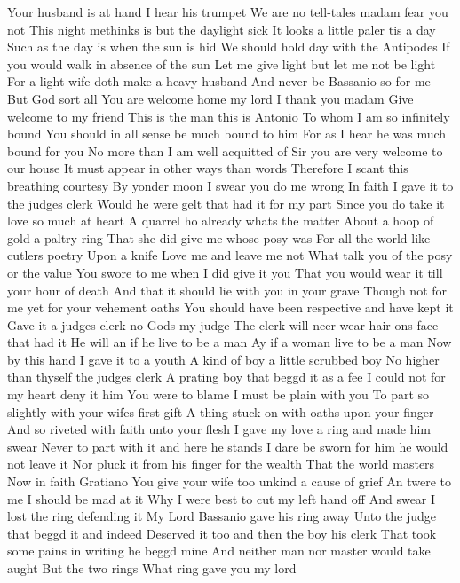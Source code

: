 Your husband is at hand I hear his trumpet 
We are no tell-tales madam fear you not 
This night methinks is but the daylight sick 
It looks a little paler tis a day 
Such as the day is when the sun is hid 
We should hold day with the Antipodes 
If you would walk in absence of the sun 
Let me give light but let me not be light 
For a light wife doth make a heavy husband 
And never be Bassanio so for me 
But God sort all You are welcome home my lord 
I thank you madam Give welcome to my friend 
This is the man this is Antonio 
To whom I am so infinitely bound 
You should in all sense be much bound to him 
For as I hear he was much bound for you 
No more than I am well acquitted of 
Sir you are very welcome to our house 
It must appear in other ways than words 
Therefore I scant this breathing courtesy 
By yonder moon I swear you do me wrong 
In faith I gave it to the judges clerk 
Would he were gelt that had it for my part 
Since you do take it love so much at heart 
A quarrel ho already whats the matter 
About a hoop of gold a paltry ring 
That she did give me whose posy was 
For all the world like cutlers poetry 
Upon a knife Love me and leave me not 
What talk you of the posy or the value 
You swore to me when I did give it you 
That you would wear it till your hour of death 
And that it should lie with you in your grave 
Though not for me yet for your vehement oaths 
You should have been respective and have kept it 
Gave it a judges clerk no Gods my judge 
The clerk will neer wear hair ons face that had it 
He will an if he live to be a man 
Ay if a woman live to be a man 
Now by this hand I gave it to a youth 
A kind of boy a little scrubbed boy 
No higher than thyself the judges clerk 
A prating boy that beggd it as a fee 
I could not for my heart deny it him 
You were to blame I must be plain with you 
To part so slightly with your wifes first gift 
A thing stuck on with oaths upon your finger 
And so riveted with faith unto your flesh 
I gave my love a ring and made him swear 
Never to part with it and here he stands 
I dare be sworn for him he would not leave it 
Nor pluck it from his finger for the wealth 
That the world masters Now in faith Gratiano 
You give your wife too unkind a cause of grief 
An twere to me I should be mad at it 
Why I were best to cut my left hand off 
And swear I lost the ring defending it 
My Lord Bassanio gave his ring away 
Unto the judge that beggd it and indeed 
Deserved it too and then the boy his clerk 
That took some pains in writing he beggd mine 
And neither man nor master would take aught 
But the two rings 
What ring gave you my lord 
